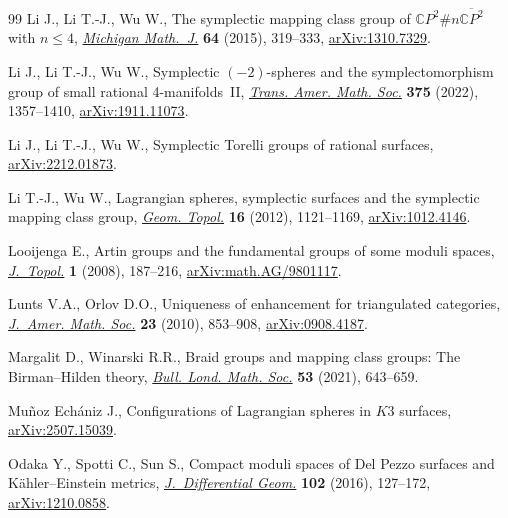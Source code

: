 \documentclass[10pt,a4paper]{amsart}
\theoremstyle{definition}
\numberwithin{equation}{section}
\begin{document}
\begin{thebibliography}{99}
Li J., Li T.-J., Wu W., The symplectic mapping class group of {$\mathbb
 CP^2\#n\overline{\mathbb CP^2}$} with {$n \le 4$},
 \href{https://doi.org/10.1307/mmj/1434731926}{\textit{Michigan Math.~J.}}
 \textbf{64} (2015), 319--333,
 \href{http://arxiv.org/abs/1310.7329}{arXiv:1310.7329}.

Li J., Li T.-J., Wu W., Symplectic {$(-2)$}-spheres and the symplectomorphism
 group of small rational 4-manifolds~{II},
 \href{https://doi.org/10.1090/tran/8517}{\textit{Trans. Amer. Math. Soc.}}
 \textbf{375} (2022), 1357--1410,
 \href{http://arxiv.org/abs/1911.11073}{arXiv:1911.11073}.

Li J., Li T.-J., Wu W., Symplectic {T}orelli groups of rational surfaces,
 \href{http://arxiv.org/abs/2212.01873}{arXiv:2212.01873}.

Li T.-J., Wu W., Lagrangian spheres, symplectic surfaces and the symplectic
 mapping class group,
 \href{https://doi.org/10.2140/gt.2012.16.1121}{\textit{Geom. Topol.}}
 \textbf{16} (2012), 1121--1169,
 \href{http://arxiv.org/abs/1012.4146}{arXiv:1012.4146}.

Looijenga E., Artin groups and the fundamental groups of some moduli spaces,
 \href{https://doi.org/10.1112/jtopol/jtm009}{\textit{J.~Topol.}} \textbf{1}
 (2008), 187--216,
 \href{http://arxiv.org/abs/math.AG/9801117}{arXiv:math.AG/9801117}.

Lunts V.A., Orlov D.O., Uniqueness of enhancement for triangulated categories,
 \href{https://doi.org/10.1090/S0894-0347-10-00664-8}{\textit{J.~Amer. Math.
 Soc.}} \textbf{23} (2010), 853--908,
 \href{http://arxiv.org/abs/0908.4187}{arXiv:0908.4187}.

Margalit D., Winarski R.R., Braid groups and mapping class groups: {T}he
 {B}irman--{H}ilden theory,
 \href{https://doi.org/10.1112/blms.12456}{\textit{Bull. Lond. Math. Soc.}}
 \textbf{53} (2021), 643--659.

Mu\~noz Ech\'aniz J., Configurations of {L}agrangian spheres in {$K3$}
 surfaces, \href{http://arxiv.org/abs/2507.15039}{arXiv:2507.15039}.

Odaka Y., Spotti C., Sun S., Compact moduli spaces of {D}el {P}ezzo surfaces
 and {K}\"{a}hler--{E}instein metrics,
 \href{https://doi.org/10.4310/jdg/1452002879}{\textit{J.~Differential Geom.}}
 \textbf{102} (2016), 127--172,
 \href{http://arxiv.org/abs/1210.0858}{arXiv:1210.0858}.


\end{thebibliography}
\end{document}
